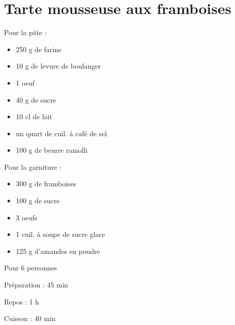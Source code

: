 \section[\normalsize{Tarte mousseuse aux framboises}]{Tarte mousseuse aux framboises}

\begin{ingredients}
\item Pour la p\^ate :
\begin{itemize}
\item	250 g de farine
\item	10 g de levure de boulanger
\item	1 oeuf
\item	40 g de sucre
\item	10 cl de lait
\item	un quart de cuil. à caf\'e de sel
\item	100 g de beurre ramolli
\end{itemize}
\item Pour la garniture :
\begin{itemize}
\item	300 g de framboises 
\item	100 g de sucre
\item	3 oeufs
\item	1 cuil. à soupe de sucre glace
\item	125 g d’amandes en poudre
\end{itemize}
\end{ingredients}
\begin{infos}
\item Pour 6 personnes
\item Préparation : 45 min
\item Repos : 1 h
\item Cuisson : 40 min
\end{infos}
